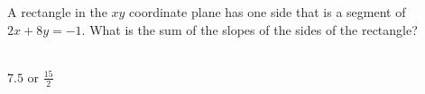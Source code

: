  
A rectangle in the $xy$ coordinate plane has one side that is a segment of $2x+8y=-1$.  What is the sum of the slopes of the sides of the rectangle?  \\\\


\ifsat
	\begin{enumerate}[label=\Alph*)]
	\end{enumerate}
\else
\fi

\ifacteven
	\begin{enumerate}[label=\textbf{\Alph*.},itemsep=\fill,align=left]
	\end{enumerate}
\else
\fi

\ifactodd
	\begin{enumerate}[label=\textbf{\Alph*.},itemsep=\fill,align=left]
	\end{enumerate}
\else
\fi

\ifgridin
$7.5$ or $\frac{15}{2}$
\else
\fi


